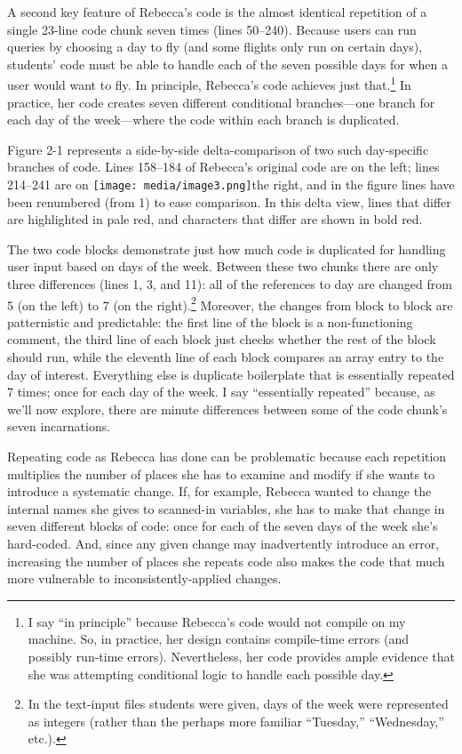 A second key feature of Rebecca's code is the almost identical
repetition of a single 23-line code chunk seven times (lines 50--240).
Because users can run queries by choosing a day to fly (and some flights
only run on certain days), students' code must be able to handle each of
the seven possible days for when a user would want to fly. In principle,
Rebecca's code achieves just that.\footnote{I say ``in principle''
  because Rebecca's code would not compile on my machine. So, in
  practice, her design contains compile-time errors (and possibly
  run-time errors). Nevertheless, her code provides ample evidence that
  she was attempting conditional logic to handle each possible day.} In
practice, her code creates seven different conditional branches---one
branch for each day of the week---where the code within each branch is
duplicated.

Figure 2-1 represents a side-by-side delta-comparison of two such
day-specific branches of code. Lines 158--184 of Rebecca's original code
are on the left; lines 214--241 are on
\texttt{[image: media/image3.png]}the
right, and in the figure lines have been renumbered (from 1) to ease
comparison. In this delta view, lines that differ are highlighted in
pale red, and characters that differ are shown in bold red.

The two code blocks demonstrate just how much code is duplicated for
handling user input based on days of the week. Between these two chunks
there are only three differences (lines 1, 3, and 11): all of the
references to day are changed from 5 (on the left) to 7 (on the
right).\footnote{In the text-input files students were given, days of
  the week were represented as integers (rather than the perhaps more
  familiar ``Tuesday,'' ``Wednesday,'' etc.).} Moreover, the changes
from block to block are patternistic and predictable: the first line of
the block is a non-functioning comment, the third line of each block
just checks whether the rest of the block should run, while the eleventh
line of each block compares an array entry to the day of interest.
Everything else is duplicate boilerplate that is essentially repeated 7
times; once for each day of the week. I say ``essentially repeated''
because, as we'll now explore, there are minute differences between some
of the code chunk's seven incarnations.

Repeating code as Rebecca has done can be problematic because each
repetition multiplies the number of places she has to examine and modify
if she wants to introduce a systematic change. If, for example, Rebecca
wanted to change the internal names she gives to scanned-in variables,
she has to make that change in seven different blocks of code: once for
each of the seven days of the week she's hard-coded. And, since any
given change may inadvertently introduce an error, increasing the number
of places she repeats code also makes the code that much more vulnerable
to inconsistently-applied changes.

